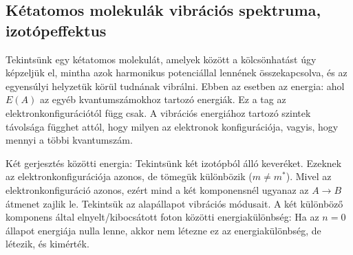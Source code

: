   \subsection{Kétatomos molekulák vibrációs spektruma, izotópeffektus}
   
   Tekintsünk egy kétatomos molekulát, amelyek között a kölcsönhatást úgy képzeljük el, mintha azok harmonikus potenciállal lennének összekapcsolva, és az egyensúlyi helyzetük körül tudnának vibrálni.
   Ebben az esetben az energia:
   ahol $E(A)$ az egyéb kvantumszámokhoz tartozó energiák.
   Ez a tag az elektronkonfigurációtól függ csak.
   A vibrációs energiához tartozó szintek távolsága függhet attól, hogy milyen az elektronok konfigurációja, vagyis, hogy mennyi a többi kvantumszám. 
   
   Két gerjesztés közötti energia:
   Tekintsünk két izotópból álló keveréket.
   Ezeknek az elektronkonfigurációja azonos, de tömegük különbözik ($m\ne m^*$).
   Mivel az elektronkonfiguráció azonos, ezért  mind a két komponensnél ugyanaz az $A\to B$ átmenet zajlik le.
   Tekintsük az alapállapot vibrációs módusait.
   A két különböző komponens által elnyelt/kibocsátott foton közötti energiakülönbség:
   Ha az $n=0$ állapot energiája nulla lenne, akkor nem létezne ez az energiakülönbség, de létezik, és kimérték.
